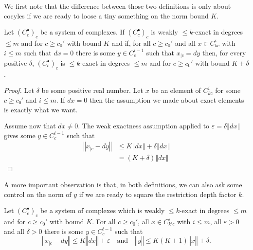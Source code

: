 We first note that the difference between those two definitions is only about cocyles if we are ready to loose
a tiny something on the norm bound $K$.

\begin{lemma}
  \label{is_bdd_exact_for_bdd_degree_above_idx_of_weakly}
  Let $(C_c^\bullet)_c$ be a system of complexes. If $(C_c^\bullet)_c$ is
  weakly $\leq k$-exact in degrees $\leq m$ and for $c\geq c_0'$ with bound $K$ and if,
  for all $c\geq c_0'$ and all $x\in C_{kc}^i$ with $i\leq m$ such that $dx = 0$
  there is some $y\in C_c^{i-1}$  such that
  $x_{|c} = dy$ then, for every positive $δ$,
  $(C_c^\bullet)_c$ is $\leq k$-exact in degrees $\leq m$ and for $c\geq c_0'$ with
  bound $K + δ$.
\end{lemma}

\begin{proof}
  Let $δ$ be some positive real number.
  Let $x$ be an element of $C_{kc}^i$ for some $c ≥ c₀'$ and $i ≤ m$. If $dx = 0$
  then the assumption we made about exact elements is exactly what we want.

  Assume now that $dx ≠ 0$. The weak exactness assumption applied to $ε = δ‖dx‖$
  gives some $y\in C_c^{i-1}$ such that
  \begin{align*}
    ‖x_{|c} - dy‖ &≤ K‖dx‖ + δ‖dx‖ \\
                  &= (K + δ)‖dx‖
  \end{align*}
\end{proof}

A more important observation is that, in both definitions, we can also ask some
control on the norm of $y$ if we are ready to square the restriction depth factor $k$.

\begin{lemma}
  \label{is_weak_bdd_exact_controlled_y}
  Let $(C_c^\bullet)_c$ be a system of complexes which is
  weakly $\leq k$-exact in degrees $\leq m$ and for $c\geq c_0'$ with bound $K$.
  For all $c\geq c_0'$, all $x\in C_{k²c}^i$ with $i\leq m$, all $ε > 0$ and all $δ > 0$
  there is some $y\in C_c^{i-1}$ such that
  \[
    ‖x_{|c} - dy‖ ≤  K ‖dx‖ + ε
    \quad \text{and} \quad
    ‖y‖ ≤ K(K + 1)‖x‖ + δ.
  \]
\end{lemma}

